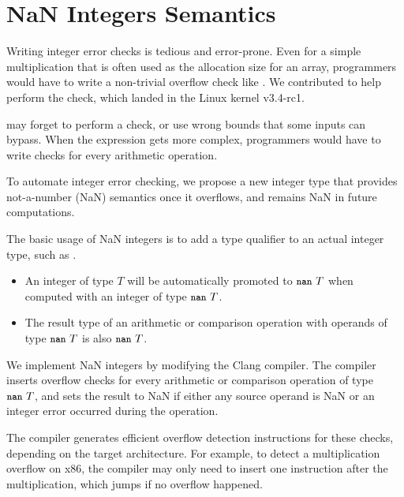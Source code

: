 \section{NaN Integers Semantics}
\label{s:miti}


Writing integer error checks is tedious and error-prone.
Even for a simple multiplication  that is often used
as the allocation size for an array, programmers would
have to write a non-trivial overflow check like .  We contributed 
to help perform the check, which landed in the Linux kernel v3.4-rc1.

may forget to perform a check, or use wrong bounds that some inputs
can bypass. 
When the expression gets more complex,
programmers would have to write checks for every arithmetic operation.

To automate integer error checking, we propose a new integer type that provides
not-a-number (NaN) semantics once it overflows, and remains NaN in future
computations.

The basic usage of NaN integers is to add a type qualifier 
to an actual integer type, such as .
\begin{itemize}
\item
An integer of type $T$ will be automatically promoted to $\cc{nan}\ T$
when computed with an integer of type $\cc{nan}\ T$.
\item
The result type of an arithmetic or comparison operation with
operands of type $\cc{nan}\ T$ is also $\cc{nan}\ T$.
\end{itemize}

We implement NaN integers by modifying the Clang compiler.
The compiler inserts overflow checks for every arithmetic or
comparison operation of type $\cc{nan}\ T$, and sets the result to
NaN if either any source operand is NaN or an integer error occurred
during the operation.

The compiler generates efficient overflow detection instructions
for these checks, depending on the target architecture.  For example,
to detect a multiplication overflow on x86, the compiler may only
need to insert one  instruction after the multiplication,
which jumps if no overflow happened.

